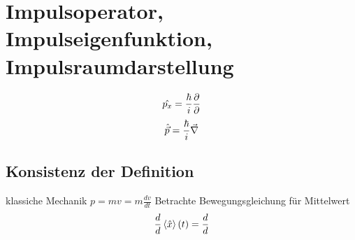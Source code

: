 \section{Impulsoperator, Impulseigenfunktion, Impulsraumdarstellung} %
\label{sec:Impulsoperator,_Impulseigenfunktion,_Impulsraumdarstellung}
\begin{equation*}
    \hat{p_x} = \frac{\hbar}{i} \frac{\partial}{\partial }
\end{equation*}
\begin{equation*}
    \hat{\vec{p}}=\frac{\hbar}{i} \vec{\nabla}
\end{equation*}
\subsection{Konsistenz der Definition} %
\label{sub:Konsistenz_der_Definition}
klassiche Mechanik $p=mv=m \frac{d v}{d t}$
Betrachte Bewegungsgleichung für Mittelwert
\begin{equation*}
    \frac{d }{d }\left\langle \hat{x} \right\rangle (t) 
    =
    \frac{d }{d }
\end{equation*}

